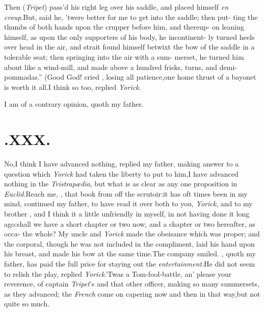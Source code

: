 \documentclass[twoside]{article}
\begin{document}
\lqq Then (\textit{Tripet}) pass’d his right leg\break
\lqq over his saddle, and placed himself \textit{en}\break
\lqq \textit{croup}.\tsk But, said he, ’twere better for\break
\lqq me to get into the saddle; then put-\break
\lqq ting the thumbs of both hands upon\break
\lqq the crupper before him, and thereup-
\lqq on leaning himself, as upon the only\break
\lqq supporters of his body, he incontinent-\break
\lqq ly turned heels over head in the air,\break
\lqq and strait found himself betwixt the\break
\lqq bow of the saddle in a tolerable seat;\break
\lqq then springing into the air with a sum-\break
\lqq merset, he turned him about like a\break
\lqq wind-mill, and made above a hundred\break
\lqq frisks, turns, and demi-pommadas.”\tsh\break
(Good God! cried \trim, losing all patience,\tsk one home thrust of a
bayonet is worth it all.\tsh I think so too, replied \textit{Yorick}.\tsh

\tsk I am of a contrary opinion, quoth my father.

\section{.\enspace  XXX.}

\quad \tsh  No,\tsk I think I have advanced\break
nothing, replied my father, making\break
answer to a question which \textit{Yorick} had\break
taken the liberty to put to him,\tsh I have
advanced nothing in the \textit{Tristrapædia},\break 
but what is as clear as any one proposi\-tion in \textit{Euclid}.\tsk Reach me,
\trim, that book from off the scrutoir:\tsh it has
oft times been in my mind, continued my father, to have read it
over both to you, \textit{Yorick}, and to my brother \toby, and
I think it a little unfriendly in myself, in not having done it
long ago:\tsh shall we have a short chapter or two
now,\tsk\break 
and a chapter or two hereafter, as occa-\break
{}
the whole? My uncle \toby and \textit{Yorick} made the obeisance
which was proper; and the corporal, though he was not included in
the compliment, laid his hand upon his breast, and made his bow at
the same time.\tsh The company smiled.\break
\trim, quoth
my father, has paid the\break
full price for staying out the \textit{entertain\-ment}.\tsh He did not seem to relish the\break
play, replied \textit{Yorick}.\tsh ’Twas a
Tom-\break fool-battle, an’ please your reverence, of captain
\textit{Tripet}’s and that other officer,\break
making so many summersets, as they advanced;\tsh
the \textit{French} come on capering now and then
in that way,\tsk but not quite so much.
\end{document}
